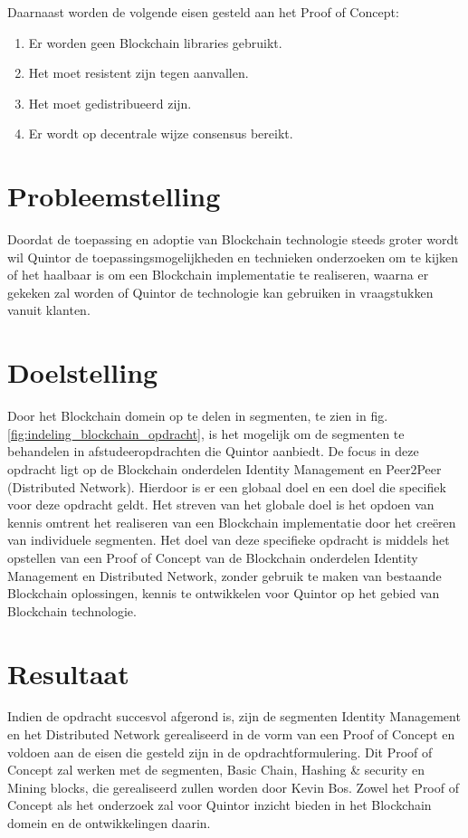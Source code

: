 Daarnaast worden de volgende eisen gesteld aan het Proof of Concept:
\begin{enumerate}[noitemsep]
  \item Er worden geen Blockchain libraries gebruikt.
  \item Het moet resistent zijn tegen aanvallen.
  \item Het moet gedistribueerd zijn.
  \item Er wordt op decentrale wijze consensus bereikt.
\end{enumerate}

\section{Probleemstelling}

Doordat de toepassing en adoptie van Blockchain technologie steeds groter wordt wil Quintor de toepassingsmogelijkheden en technieken onderzoeken om te kijken of het haalbaar is om een Blockchain implementatie te realiseren, waarna er gekeken zal worden of Quintor de technologie kan gebruiken in vraagstukken vanuit klanten.

\section{Doelstelling}

Door het Blockchain domein op te delen in segmenten, te zien in fig. \ref{fig:indeling_blockchain_opdracht}, is het mogelijk om de segmenten te behandelen in afstudeeropdrachten die Quintor aanbiedt. De focus in deze opdracht ligt op de Blockchain onderdelen Identity Management en Peer2Peer (Distributed Network). Hierdoor is er een globaal doel en een doel die specifiek voor deze opdracht geldt. Het streven van het globale doel is het opdoen van kennis omtrent het realiseren van een Blockchain implementatie door het creëren van individuele segmenten. Het doel van deze specifieke opdracht is middels het opstellen van een Proof of Concept van de Blockchain onderdelen Identity Management en Distributed Network, zonder gebruik te maken van bestaande Blockchain oplossingen, kennis te ontwikkelen voor Quintor op het gebied van Blockchain technologie.

\section{Resultaat}

Indien de opdracht succesvol afgerond is, zijn de segmenten Identity Management en het Distributed Network gerealiseerd in de vorm van een Proof of Concept en voldoen aan de eisen die gesteld zijn in de opdrachtformulering. Dit Proof of Concept zal werken met de segmenten, Basic Chain, Hashing \& security en Mining blocks, die gerealiseerd zullen worden door Kevin Bos. Zowel het Proof of Concept als het onderzoek zal voor Quintor inzicht bieden in het Blockchain domein en de ontwikkelingen daarin.

